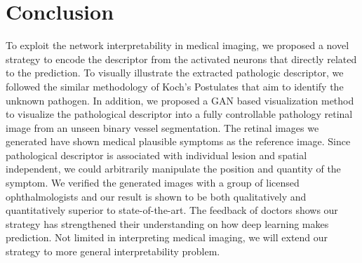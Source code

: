\documentclass[letterpaper]{article} %
\begin{document}







	\section{Conclusion}
        To exploit the network interpretability in medical imaging, we proposed a novel strategy to encode the descriptor from the activated neurons that directly related to the prediction. To visually illustrate the extracted pathologic descriptor, we followed the similar methodology of Koch's Postulates that aim to identify the unknown pathogen. In addition, we proposed a GAN based visualization method to visualize the pathological descriptor into a fully controllable pathology retinal image from an unseen binary vessel segmentation. The retinal images we generated have shown medical plausible symptoms  as the reference image. Since pathological descriptor is associated with individual lesion and spatial independent, we could arbitrarily manipulate the position and quantity of the symptom. We verified the generated images with  a group of  licensed ophthalmologists and our result is shown to be both qualitatively and quantitatively superior to state-of-the-art.
        The feedback of doctors shows our strategy  has strengthened their understanding on how deep learning makes prediction. Not limited in interpreting medical imaging, we will extend our strategy to more general interpretability problem.
\end{document}
